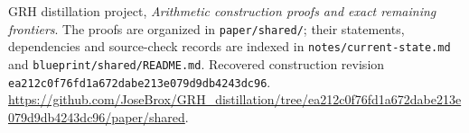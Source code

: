 GRH distillation project,
\emph{Arithmetic construction proofs and exact remaining frontiers}.
The proofs are organized in \texttt{paper/shared/}; their statements,
dependencies and source-check records are indexed in
\texttt{notes/current-state.md} and \texttt{blueprint/shared/README.md}.
Recovered construction revision
\texttt{ea212c0f76fd1a672dabe213e079d9db4243dc96}.
\url{https://github.com/JoseBrox/GRH_distillation/tree/ea212c0f76fd1a672dabe213e079d9db4243dc96/paper/shared}.
